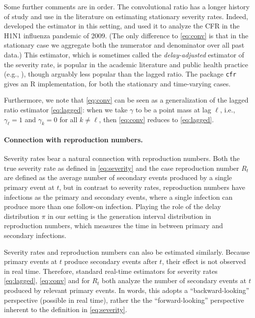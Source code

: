 \documentclass{article}
\begin{document}
Some further comments are in order. The convolutional ratio has a longer history
of study and use in the literature on estimating stationary severity
rates. Indeed, \citet{nishiura} developed the estimator in this setting,  
and used it to analyze the CFR in the H1N1 influenza pandemic of 2009. (The only 
difference to \eqref{eq:conv} is that in the stationary case we aggregate both
the numerator and denominator over all past data.) This estimator, which is
sometimes called the \emph{delay-adjusted} estimator of the severity rate, is
popular in the academic literature and public health practice (e.g., 
\citealp{nishiuraEx1, nishiuraEx2, Russell2020, Unnikrishnan2021}), though   
arguably less popular than the lagged ratio. The package \texttt{cfr}
\citep{cfr_package} gives an R implementation, for both the stationary and
time-varying cases.  

Furthermore, we note that \eqref{eq:conv} can be seen as a generalization of the  
lagged ratio estimator \eqref{eq:lagged}: when we take $\gamma$ to be a point
mass at lag $\ell$, i.e., $\gamma_\ell = 1$ and $\gamma_k = 0$ for all $k \not=
\ell$, then \eqref{eq:conv} reduces to \eqref{eq:lagged}.   

\paragraph{Connection with reproduction numbers.} 

Severity rates bear a natural connection with reproduction numbers. Both the
true severity rate as defined in \eqref{eq:severity} and the case reproduction
number $R_t$ are defined as the average number of secondary events produced by a
single primary event at $t$, but in contrast to severity rates, reproduction
numbers have infections as the primary and secondary events, where a single
infection can produce more than one follow-on infection. Playing the role of the
delay distribution $\pi$ in our setting is the generation interval distribution
in reproduction numbers, which measures the time in between primary and
secondary infections.  

Severity rates and reproduction numbers can also be estimated similarly. Because
primary events at $t$ produce secondary events after $t$, their effect is not
observed in real time. Therefore, standard real-time estimators for severity
rates \eqref{eq:lagged}, \eqref{eq:conv} and for $R_t$ both analyze the number
of  secondary events at $t$ produced by relevant primary events. In words, this 
adopts a ``backward-looking'' perspective (possible in real time), rather the 
the ``forward-looking'' perspective inherent to the definition in
\eqref{eq:severity}. 
\end{document}
